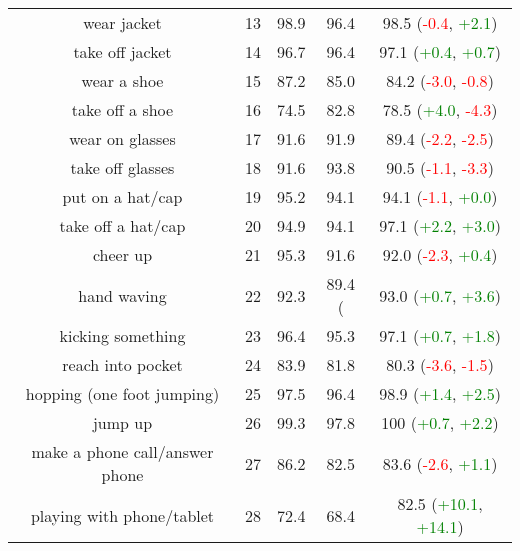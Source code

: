 \documentclass[runningheads]{llncs}
\begin{document}
\begin{centering}
\begin{longtable}{c|c|ccc}
        wear jacket                       & 13   & 98.9  & 96.4   & 98.5 (\textcolor{red}{-0.4}, \textcolor{green}{+2.1})   \\
        take off jacket                   & 14   & 96.7  & 96.4   & 97.1 (\textcolor{green}{+0.4}, \textcolor{green}{+0.7})   \\
        wear a shoe                       & 15   & 87.2  & 85.0  & 84.2 (\textcolor{red}{-3.0}, \textcolor{red}{-0.8})    \\
        take off a shoe                   & 16   & 74.5  & 82.8   & 78.5 (\textcolor{green}{+4.0}, \textcolor{red}{-4.3})     \\
        wear on glasses                   & 17   & 91.6  & 91.9  & 89.4 (\textcolor{red}{-2.2}, \textcolor{red}{-2.5})     \\
        take off glasses                  & 18   & 91.6 & 93.8  & 90.5 (\textcolor{red}{-1.1}, \textcolor{red}{-3.3})    \\
        put on a hat/cap                  & 19   & 95.2  & 94.1   & 94.1 (\textcolor{red}{-1.1}, \textcolor{green}{+0.0})   \\
        take off a hat/cap                & 20   & 94.9  & 94.1   & 97.1 (\textcolor{green}{+2.2}, \textcolor{green}{+3.0})   \\
        cheer up                          & 21   & 95.3 & 91.6   & 92.0 (\textcolor{red}{-2.3}, \textcolor{green}{+0.4})   \\
        hand waving                       & 22   & 92.3  & 89.4 ( & 93.0 (\textcolor{green}{+0.7}, \textcolor{green}{+3.6})  \\
        kicking something                 & 23   & 96.4  & 95.3   & 97.1 (\textcolor{green}{+0.7}, \textcolor{green}{+1.8})  \\
        reach into pocket                 & 24   & 83.9  & 81.8   & 80.3 (\textcolor{red}{-3.6}, \textcolor{red}{-1.5})     \\
        hopping (one foot jumping)        & 25   & 97.5  & 96.4   & 98.9 (\textcolor{green}{+1.4}, \textcolor{green}{+2.5})  \\
        jump up                           & 26   & 99.3  & 97.8   & 100 (\textcolor{green}{+0.7}, \textcolor{green}{+2.2})    \\
        make a phone call/answer phone    & 27   & 86.2  & 82.5   & 83.6 (\textcolor{red}{-2.6}, \textcolor{green}{+1.1})  \\
        playing with phone/tablet         & 28   & 72.4  & 68.4     & 82.5  (\textcolor{green}{+10.1}, \textcolor{green}{+14.1}) \\

\end{longtable}
\end{centering}
\end{document}

